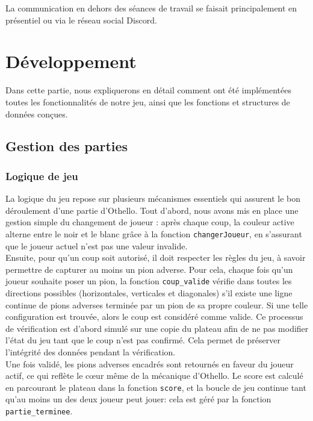 \documentclass[12pt, a4paper, oneside]{article}
\begin{document}
    La communication en dehors des séances de travail se faisait principalement en présentiel ou via le réseau social Discord.

\section{Développement}
    Dans cette partie, nous expliquerons en détail comment ont été implémentées toutes les fonctionnalités de notre jeu, ainsi que les fonctions et structures de données conçues. 
    \subsection{Gestion des parties}

    \subsubsection{Logique de jeu}

    La logique du jeu repose sur plusieurs mécanismes essentiels qui assurent
    le bon déroulement d’une partie d’Othello. Tout d’abord, nous avons mis
    en place une gestion simple du changement de joueur : après chaque coup,
    la couleur active alterne entre le noir et le blanc grâce à la fonction \texttt{changerJoueur}, en s’assurant que le
    joueur actuel n’est pas une valeur invalide.\\

    Ensuite, pour qu’un coup soit autorisé, il doit respecter les règles du jeu, à savoir permettre de
    capturer au moins un pion adverse. Pour cela, chaque fois qu’un joueur 
    souhaite poser un pion, la fonction \texttt{coup\_valide} vérifie dans toutes les directions
    possibles (horizontales, verticales et diagonales) s’il existe une ligne
    continue de pions adverses terminée par un pion de sa propre couleur. Si
    une telle configuration est trouvée, alors le coup est considéré comme
    valide. Ce processus de vérification est d’abord simulé sur une copie du
    plateau afin de ne pas modifier l’état du jeu tant que le coup n’est pas
    confirmé. Cela permet de préserver l'intégrité des données pendant la
    vérification. \\

    Une fois validé, les pions adverses encadrés sont retournés
    en faveur du joueur actif, ce qui reflète le cœur même de la mécanique 
    d’Othello. Le score est calculé en parcourant le plateau dans la fonction \texttt{score},
    et la boucle de jeu continue tant qu'au moins un des deux joueur peut jouer: cela est géré par la fonction \texttt{partie\_terminee}.
\end{document}
